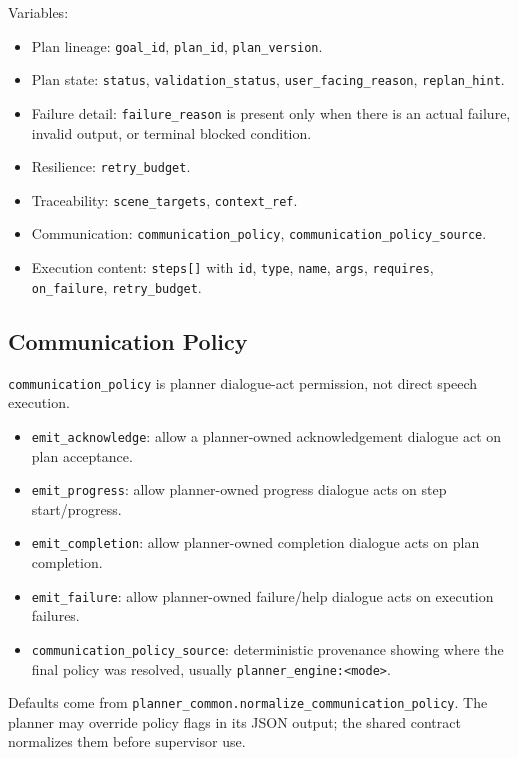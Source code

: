 \documentclass[12pt,a4paper]{article}
\newcommand{\code}[1]{\texttt{#1}}
\begin{document}
Variables:

\begin{itemize}
\item Plan lineage: \code{goal\_id}, \code{plan\_id}, \code{plan\_version}.
\item Plan state: \code{status}, \code{validation\_status}, \code{user\_facing\_reason}, \code{replan\_hint}.
\item Failure detail: \code{failure\_reason} is present only when there is an actual failure, invalid output, or terminal blocked condition.
\item Resilience: \code{retry\_budget}.
\item Traceability: \code{scene\_targets}, \code{context\_ref}.
\item Communication: \code{communication\_policy}, \code{communication\_policy\_source}.
\item Execution content: \code{steps[]} with \code{id}, \code{type}, \code{name}, \code{args}, \code{requires}, \code{on\_failure}, \code{retry\_budget}.
\end{itemize}



\subsection{Communication Policy}

\code{communication\_policy} is planner dialogue-act permission, not direct speech execution.

\begin{itemize}
\item \code{emit\_acknowledge}: allow a planner-owned acknowledgement dialogue act on plan acceptance.
\item \code{emit\_progress}: allow planner-owned progress dialogue acts on step start/progress.
\item \code{emit\_completion}: allow planner-owned completion dialogue acts on plan completion.
\item \code{emit\_failure}: allow planner-owned failure/help dialogue acts on execution failures.
\item \code{communication\_policy\_source}: deterministic provenance showing where the final policy was resolved, usually \code{planner\_engine:<mode>}.
\end{itemize}

Defaults come from \code{planner\_common.normalize\_communication\_policy}. The planner may override policy flags in its JSON output; the shared contract normalizes them before supervisor use.
\end{document}
